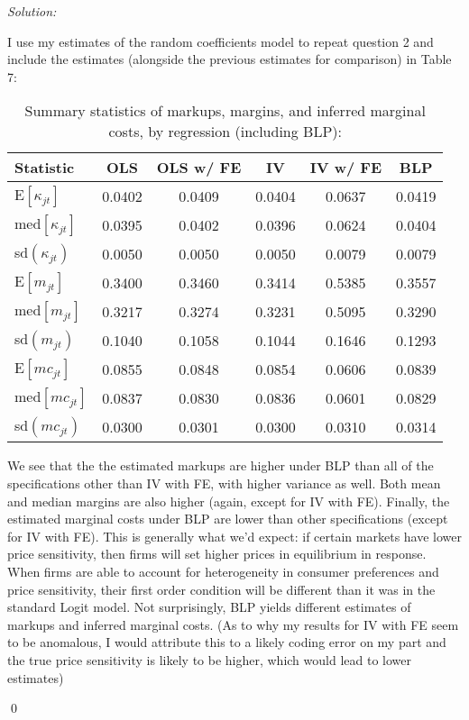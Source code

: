 \documentclass[12pt]{article}
\newenvironment{sol}
    {\emph{Solution:}
    }
    {
    \qed
    }
\begin{document}
\begin{sol}
I use my estimates of the random coefficients model to repeat question 2 and include the estimates (alongside the previous estimates for comparison) in Table 7:
\begin{center}
    \begin{table}[htbp]
        \centering
        \caption{Summary statistics of markups, margins, and inferred marginal costs, by regression (including BLP):}
          \begin{tabular}{lccccc}
              \toprule
                Statistic    & OLS          & OLS w/ FE & IV & IV w/ FE &BLP       \\
              \midrule
                E$[\kappa_{jt}]$   &0.0402 &0.0409&0.0404&0.0637&0.0419 \\
                med$[\kappa_{jt}]$ &0.0395 &0.0402&0.0396&0.0624&0.0404   \\
                 sd$(\kappa_{jt})$ &0.0050 &0.0050&0.0050&0.0079&0.0079  \\
                \midrule
                E$[m_{jt}]$        &0.3400 &0.3460&0.3414&0.5385&0.3557 \\
                med$[m_{jt}]$      &0.3217 &0.3274&0.3231&0.5095&0.3290   \\
                 sd$(m_{jt})$      &0.1040 &0.1058&0.1044&0.1646&0.1293  \\
                 \midrule
                 E$[mc_{jt}]$      &0.0855 &0.0848&0.0854&0.0606&0.0839 \\
                med$[mc_{jt}]$     &0.0837 &0.0830&0.0836&0.0601&0.0829   \\
                 sd$(mc_{jt})$     &0.0300 &0.0301&0.0300&0.0310&0.0314  \\
              \bottomrule
          \end{tabular}
        \label{tab:moments_blp}
      \end{table}
\end{center}
We see that the the estimated markups are higher under BLP than all of the specifications other than IV with FE, with higher variance as well. Both mean and median margins are also higher (again, except for IV with FE). Finally, the estimated marginal costs under BLP are lower than other specifications (except for IV with FE). This is generally what we'd expect: if certain markets have lower price sensitivity, then firms will set higher prices in equilibrium in response. When firms are able to account for heterogeneity in consumer preferences and price sensitivity, their first order condition will be different than it was in the standard Logit model. Not surprisingly, BLP yields different estimates of markups and inferred marginal costs. (As to why my results for IV with FE seem to be anomalous, I would attribute this to a likely coding error on my part and the true price sensitivity is likely to be higher, which would lead to lower estimates)
\end{sol}
\end{document}
